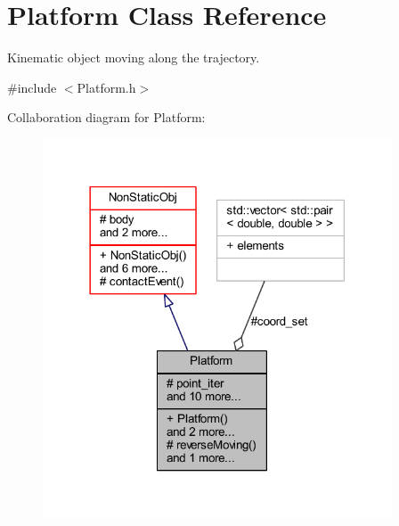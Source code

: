\hypertarget{class_platform}{}\section{Platform Class Reference}
\label{class_platform}


Kinematic object moving along the trajectory.  




{\ttfamily \#include $<$Platform.\+h$>$}



Collaboration diagram for Platform\+:
\nopagebreak
\begin{figure}[H]
\begin{center}
\leavevmode
\includegraphics[width=294pt]{class_platform__coll__graph}
\end{center}
\end{figure}
